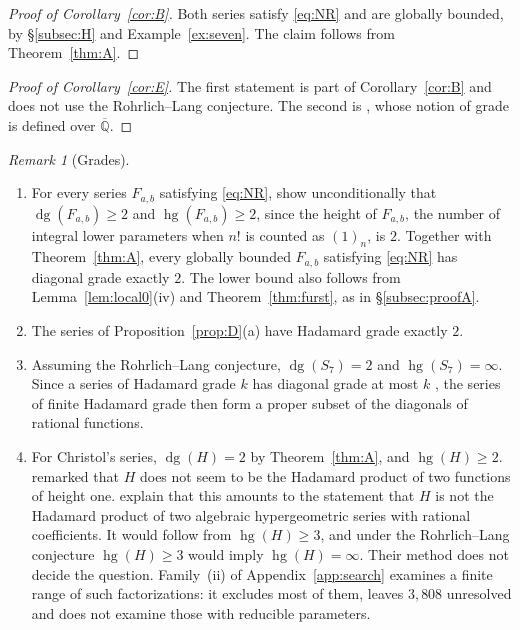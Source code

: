 \documentclass[11pt]{amsart}
\theoremstyle{definition}
\theoremstyle{remark}
\newtheorem{remark}[theorem]{Remark}
\numberwithin{equation}{section}
\newcommand{\Qb}{\overline{\mathbb{Q}}}
\DeclareMathOperator{\hg}{hg}
\DeclareMathOperator{\dg}{dg}
\newcommand{\Fab}{F_{a,b}}
\begin{document}
\begin{proof}[Proof of Corollary~\ref{cor:B}]
Both series satisfy \eqref{eq:NR} and are globally bounded, by \S\ref{subsec:H} and Example~\ref{ex:seven}. The claim follows from Theorem~\ref{thm:A}.
\end{proof}

\begin{proof}[Proof of Corollary~\ref{cor:E}]
The first statement is part of Corollary~\ref{cor:B} and does not use the Rohrlich--Lang conjecture. The second is \citet[Proposition~1]{RivoalRoques2014}, whose notion of grade is defined over $\Qb$.
\end{proof}

\begin{remark}[Grades]\label{rem:grades}
\begin{enumerate}[label=(\arabic*),leftmargin=2em]
\item For every series $\Fab$ satisfying \eqref{eq:NR}, \citet[Theorem~3.8]{HarderKramerMiller2025} show unconditionally that $\dg(\Fab)\ge2$ and $\hg(\Fab)\ge2$, since the height of $\Fab$, the number of integral lower parameters when $n!$ is counted as $(1)_n$, is $2$. Together with Theorem~\ref{thm:A}, every globally bounded $\Fab$ satisfying \eqref{eq:NR} has diagonal grade exactly $2$. The lower bound also follows from Lemma~\ref{lem:local0}(iv) and Theorem~\ref{thm:furst}, as in \S\ref{subsec:proofA}.
\item The series of Proposition~\ref{prop:D}(a) have Hadamard grade exactly $2$.
\item Assuming the Rohrlich--Lang conjecture, $\dg(S_7)=2$ and $\hg(S_7)=\infty$. Since a series of Hadamard grade $k$ has diagonal grade at most $k$ \citep[Proposition~4.1]{HarderKramerMiller2025}, the series of finite Hadamard grade then form a proper subset of the diagonals of rational functions.
\item For Christol's series, $\dg(H)=2$ by Theorem~\ref{thm:A}, and $\hg(H)\ge2$. \citet[\S VII]{Christol1987} remarked that $H$ does not seem to be the Hadamard product of two functions of height one. \citet[\S10]{RivoalRoques2014} explain that this amounts to the statement that $H$ is not the Hadamard product of two algebraic hypergeometric series with rational coefficients. It would follow from $\hg(H)\ge3$, and under the Rohrlich--Lang conjecture $\hg(H)\ge3$ would imply $\hg(H)=\infty$. Their method does not decide the question. Family~(ii) of Appendix~\ref{app:search} examines a finite range of such factorizations: it excludes most of them, leaves $3{,}808$ unresolved and does not examine those with reducible parameters.
\end{enumerate}
\end{remark}
\end{document}
